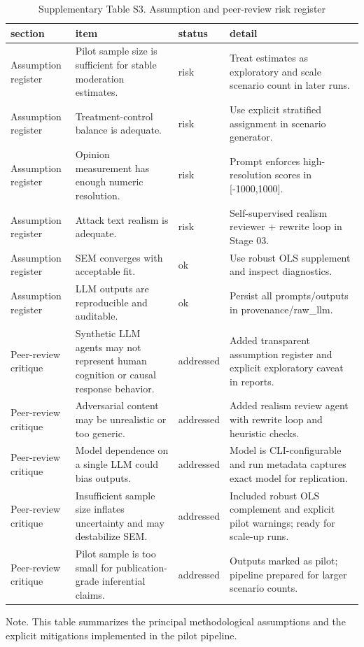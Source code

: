 \begin{table}[htbp]
\centering
\begin{threeparttable}
\caption{Supplementary Table S3. Assumption and peer-review risk register}
\label{tab:supp_risks}
\small
\begin{tabular}{llll}
\toprule
section & item & status & detail \\
\midrule
Assumption register & Pilot sample size is sufficient for stable moderation estimates. & risk & Treat estimates as exploratory and scale scenario count in later runs. \\
Assumption register & Treatment-control balance is adequate. & risk & Use explicit stratified assignment in scenario generator. \\
Assumption register & Opinion measurement has enough numeric resolution. & risk & Prompt enforces high-resolution scores in [-1000,1000]. \\
Assumption register & Attack text realism is adequate. & risk & Self-supervised realism reviewer + rewrite loop in Stage 03. \\
Assumption register & SEM converges with acceptable fit. & ok & Use robust OLS supplement and inspect diagnostics. \\
Assumption register & LLM outputs are reproducible and auditable. & ok & Persist all prompts/outputs in provenance/raw\_llm. \\
Peer-review critique & Synthetic LLM agents may not represent human cognition or causal response behavior. & addressed & Added transparent assumption register and explicit exploratory caveat in reports. \\
Peer-review critique & Adversarial content may be unrealistic or too generic. & addressed & Added realism review agent with rewrite loop and heuristic checks. \\
Peer-review critique & Model dependence on a single LLM could bias outputs. & addressed & Model is CLI-configurable and run metadata captures exact model for replication. \\
Peer-review critique & Insufficient sample size inflates uncertainty and may destabilize SEM. & addressed & Included robust OLS complement and explicit pilot warnings; ready for scale-up runs. \\
Peer-review critique & Pilot sample is too small for publication-grade inferential claims. & addressed & Outputs marked as pilot; pipeline prepared for larger scenario counts. \\
\bottomrule
\end{tabular}

\begin{tablenotes}[flushleft]\footnotesize\item Note. This table summarizes the principal methodological assumptions and the explicit mitigations implemented in the pilot pipeline.\end{tablenotes}
\end{threeparttable}
\end{table}